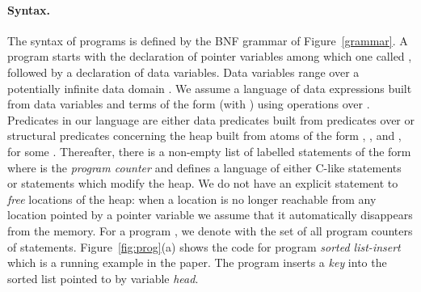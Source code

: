 \documentclass{llncs}
\newcommand{\ignore}[1]{}
\begin{document}
\ignore{



\begin{wrapfigure}[h]{r}[20pt]{83mm}
  \begin{center}
\vspace*{-35pt}

{\bf \scriptsize
  \begin{grammar}
    <prgm> ::=  pointer ; data ;  <pc\_stmt>


\vspace*{-5pt}
    <pc\_stmt> ::=  <stmt>;

  \vspace*{-5pt}
      <stmt> ::= <ctrl\_stmt> | <heap\_stmt>

  \vspace*{-5pt}

     <ctrl\_stmt> ::= <data\_expr>  {\tt skip}
     {\tt assume}(<pred>) \alt {\tt if} <pred> {\tt then} <pc\_stmt> {\tt else} <pc\_stmt> {\tt fi}
\alt {\tt while} <pred> {\tt do} <pc\_stmt> {\tt od}

  \vspace*{-5pt}


     <heap\_stmt> ::= \mbox{}  \mbox{}    \mbox{} \alt \mbox{}  \mbox{}  \mbox{} \alt 







\end{grammar}
}

  \end{center}


\end{wrapfigure}
}



\paragraph{Syntax.}
The syntax of programs is defined by the BNF grammar of Figure~\ref{grammar}.
A program starts with the declaration of pointer variables among which one called , followed by a declaration of data variables. Data variables range over a potentially infinite data domain . We assume a language of data expressions built from data variables and terms of the form
 (with ) using operations over .
Predicates in our language are either data predicates built from predicates over  or structural predicates concerning the heap built from atoms of the form , , and  , for some . Thereafter, there is a non-empty list of labelled statements of the form
 where  is the {\em program counter} and  defines a language of either C-like statements or statements which modify the heap.  We do not have an explicit statement to {\em free} locations of the heap: when a location is no longer reachable from any location pointed by a pointer variable we assume that it automatically disappears from the memory. For a program , we denote with  the set of all program counters of  statements.
Figure~\ref{fig:prog}(a) shows the code for program \emph{sorted list-insert} which is a running example in the paper. The program inserts a \emph{key} into the sorted list pointed to by variable \emph{head}.
\end{document}
